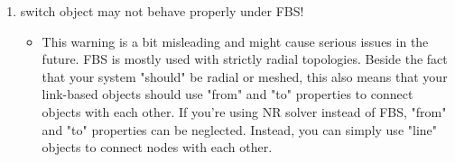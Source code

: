 \documentclass{article}
\begin{document}
    \begin{enumerate}
        \item switch object may not behave properly under FBS!
        \begin{itemize}
            \item This warning is a bit misleading and might cause serious issues in the future. FBS is mostly used with strictly radial topologies. Beside the fact that your system "should" be radial or meshed, this also means that your link-based objects should use "from" and "to" properties to connect objects with each other. If you're using NR solver instead of FBS, "from" and "to" properties can be neglected. Instead, you can simply use "line" objects to connect nodes with each other.
        \end{itemize}
    \end{enumerate}
    \newpage
    
    
    
    
    
    \newpage
    \nocite{*}
    
    
\end{document}
